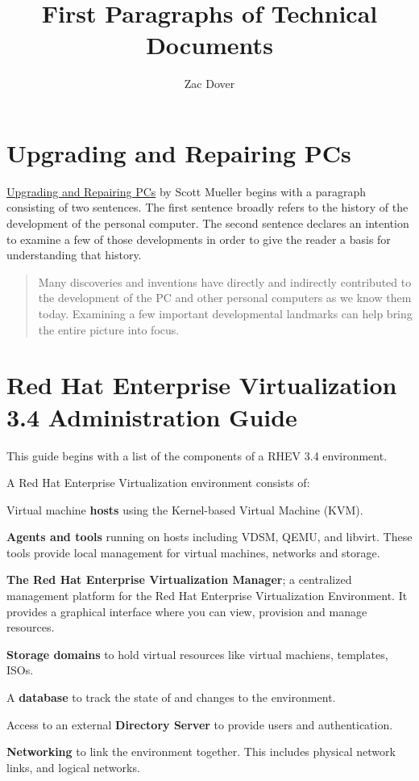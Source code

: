 \documentclass[a4paper,12pt]{article}
\title{First Paragraphs of Technical Documents}
\author{Zac Dover}
\begin{document}
\maketitle

\section{Upgrading and Repairing PCs}
\underline{Upgrading and Repairing PCs} by Scott Mueller begins with a paragraph consisting of two sentences. The first sentence broadly refers to the history of the development of the personal computer. The second sentence declares an intention to examine a few of those developments in order to give the reader a basis for understanding that history.
\begin{quotation}
Many discoveries and inventions have directly and indirectly contributed to the development of the PC and other personal computers as we know them today. Examining a few important developmental landmarks can help bring the entire picture into focus.
\end{quotation}

\section{Red Hat Enterprise Virtualization 3.4 Administration Guide}
This guide begins with a list of the components of a RHEV 3.4 environment.
\begin{displayquote}
{\tiny A Red Hat Enterprise Virtualization environment consists of:}
\begin{itemize}
{\tiny  \item Virtual machine \textbf{hosts} using the Kernel-based Virtual Machine (KVM).}
{\tiny  \item \textbf{Agents and tools} running on hosts including VDSM, QEMU, and libvirt. These tools provide local management for virtual machines, networks and storage.}
{\tiny  \item \textbf{The Red Hat Enterprise Virtualization Manager}; a centralized management platform for the Red Hat Enterprise Virtualization Environment. It provides a graphical interface where you can view, provision and manage resources.}
{\tiny  \item \textbf{Storage domains} to hold virtual resources like virtual machiens, templates, ISOs.}
{\tiny  \item A \textbf{database} to track the state of and changes to the environment.}
{\tiny  \item Access to an external \textbf{Directory Server} to provide users and authentication.}
{\tiny  \item \textbf{Networking} to link the environment together. This includes physical network links, and logical networks.}
\end{itemize}
\end{displayquote}
\end{document}
